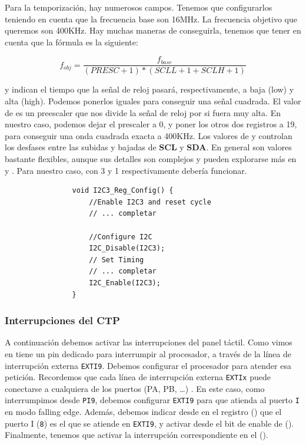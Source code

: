 \documentclass[../main.tex]{subfiles}
\begin{document}
            Para la temporización, hay numerosos campos. Tenemos que configurarlos teniendo en cuenta que la frecuencia base son 16MHz. La frecuencia objetivo que queremos son 400KHz. Hay muchas maneras de conseguirla, tenemos que tener en cuenta que la fórmula es la siguiente:

            \[
                f_{obj} = \frac{f_{base}}{(PRESC+1)*(SCLL+1+SCLH+1)}
            \]

             y  indican el tiempo que la señal de reloj pasará, respectivamente, a baja (low) y alta (high). Podemos ponerlos iguales para conseguir una señal cuadrada. El valor de  es un preescaler que nos divide la señal de reloj por si fuera muy alta. En nuestro caso, podemos dejar el prescaler a 0, y poner los otros dos registros a 19, para conseguir una onda cuadrada exacta a 400KHz. Los valores de  y  controlan los desfases entre las subidas y bajadas de \textbf{SCL} y \textbf{SDA}. En general son valores bastante flexibles, aunque sus detalles son complejos y pueden explorarse más en \REFMAN[26.9.5] y \REFMAN[26.4.5]. Para nuestro caso, con 3 y 1 respectivamente debería funcionar.

            \begin{lstlisting}
                void I2C3_Reg_Config() {
                    //Enable I2C3 and reset cycle 
                    // ... completar

                    //Configure I2C
                    I2C_Disable(I2C3);
                    // Set Timing 
                    // ... completar 
                    I2C_Enable(I2C3);
                }
            \end{lstlisting}

        \subsubsection{Interrupciones del CTP}

            A continuación debemos activar las interrupciones del panel táctil. Como vimos en  tiene un pin dedicado para interrumpir al procesador, a través de la línea de interrupción externa \texttt{EXTI9}. Debemos configurar el procesador para atender esa petición. Recordemos que cada línea de interrupción externa \texttt{EXTIx} puede conectarse a cualquiera de los puertos (PA, PB, \dots) \REFMAN[10]. En este caso, como interrumpimos desde \texttt{PI9}, debemos configurar \texttt{EXTI9} para que atienda al puerto \texttt{I} en modo falling edge. Además, debemos indicar desde  en el registro  (\REFMAN[7.2.3]) que el puerto I (\texttt{8}) es el que se atiende en \texttt{EXTI9}, y activar  desde el bit de enable de  (\REFMAN[5.3.19]). Finalmente, tenemos que activar la interrupción correspondiente en el  (\REFMAN[9.1.2]).
\end{document}
